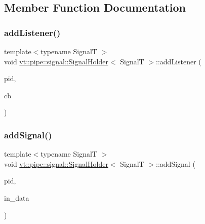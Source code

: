 \subsection{Member Function Documentation}
\mbox{\label{structvt_1_1pipe_1_1signal_1_1_signal_holder_aee30c3b7c07d695450e1d6a9953ee98a}} 
\subsubsection{\texorpdfstring{add\+Listener()}{addListener()}}
{\footnotesize\ttfamily template$<$typename SignalT $>$ \\
void \hyperlink{structvt_1_1pipe_1_1signal_1_1_signal_holder}{vt\+::pipe\+::signal\+::\+Signal\+Holder}$<$ SignalT $>$\+::add\+Listener (\begin{DoxyParamCaption}\item[{\hyperlink{namespacevt_ac9852acda74d1896f48f406cd72c7bd3}{Pipe\+Type} const \&}]{pid,  }\item[{\hyperlink{structvt_1_1pipe_1_1signal_1_1_signal_holder_a23af418129e6e8ecb4ee9621e6fd6f90}{Listener\+Type} \&\&}]{cb }\end{DoxyParamCaption})}

\mbox{\label{structvt_1_1pipe_1_1signal_1_1_signal_holder_ae32b546852bc4518b6d75f2e43a5eb5f}} 
\subsubsection{\texorpdfstring{add\+Signal()}{addSignal()}}
{\footnotesize\ttfamily template$<$typename SignalT $>$ \\
void \hyperlink{structvt_1_1pipe_1_1signal_1_1_signal_holder}{vt\+::pipe\+::signal\+::\+Signal\+Holder}$<$ SignalT $>$\+::add\+Signal (\begin{DoxyParamCaption}\item[{\hyperlink{namespacevt_ac9852acda74d1896f48f406cd72c7bd3}{Pipe\+Type} const \&}]{pid,  }\item[{\hyperlink{structvt_1_1pipe_1_1signal_1_1_signal_holder_aad5bfc2b46dfa071ae638385324d7e31}{Data\+Ptr\+Type}}]{in\+\_\+data }\end{DoxyParamCaption})}

